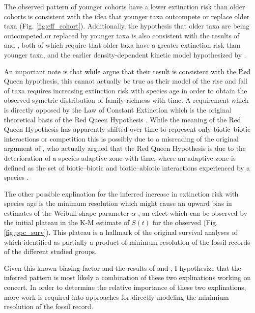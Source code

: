 \documentclass[12pt,letterpaper]{article}
\begin{document}
The observed pattern of younger cohorts have a lower extinction risk than older cohorts is consistent with the idea that younger taxa outcompete or replace older taxa (Fig. \ref{fig:eff_cohort}). Additionally, the hypothesis that older taxa are being outcompeted or replaced by younger taxa is also consistent with the results of \citet{Wagner2014b} and \citet{Quental2013}, both of which require that older taxa have a greater extinction risk than younger taxa, and the earlier density-dependent kinetic model hypothesized by \citet*{Sepkoski1978,Sepkoski1979,Sepkoski1984}.

An important note is that while \citet{Quental2013} argue that their result is consistent with the Red Queen hypothesis, this cannot actually be true as their model of the rise and fall of taxa requires increasing extinction risk with species age in order to obtain the observed symetric distribution of family richness with time. A requirement which is directly opposed by the Law of Constant Extinction which is the original theoretical basis of the Red Queen Hypothesis \citep{VanValen1973}. While the meaning of the Red Queen Hypothesis has apparently shifted over time to represent only biotic--biotic interactions or competition \citep{Barnosky2001a} this is possibly due to a misreading of the original argument of \citet{VanValen1973}, who actually argued that the Red Queen Hypothesis is due to the deterioration of a species adaptive zone with time, where an adaptive zone is defined as the set of biotic--biotic and biotic--abiotic interactions experienced by a species \citep{Simpson1944,Liow2011a}.


The other possible explination for the inferred increase in extinction risk with species age is the minimum resolution which might cause an upward bias in estimates of the Weibull shape parameter \(\alpha\) \citep{Sepkoski1975}, an effect which can be observed by the initial plateau in the K-M estimate of \(S(t)\) for the observed (Fig. \ref{fig:ppc_surv}). This plateau is a hallmark of the original survival analyses of \citet{VanValen1973} which \citet{Sepkoski1975} identified as partially a product of minimum resolution of the fossil records of the different studied groups.

Given this known biasing factor and the results of \citet{Wagner2014b} and \citet{Quental2013}, I hypothesize that the inferred pattern is most likely a combination of these two explinations working on concert. In order to determine the relative importance of these two explinations, more work is required into approaches for directly modeling the minimium resolution of the fossil record.
\end{document}
